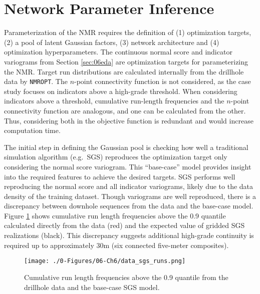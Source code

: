 \FloatBarrier
\section{Network Parameter Inference}
\label{sec:06param}

Parameterization of the \gls{NMR} requires the definition of (1) optimization targets, (2) a pool of latent Gaussian factors, (3) network architecture and (4) optimization hyperparameters. The continuous normal score and indicator variograms from Section \ref{sec:06eda} are optimization targets for parameterizing the \gls{NMR}. Target run distributions are calculated internally from the drillhole data by \texttt{NMROPT}. The $n$-point connectivity function is not considered, as the case study focuses on indicators above a high-grade threshold. When considering indicators above a threshold, cumulative run-length frequencies and the $n$-point connectivity function are analogous, and one can be calculated from the other. Thus, considering both in the objective function is redundant and would increase computation time.

The initial step in defining the Gaussian pool is checking how well a traditional simulation algorithm (e.g.\ \gls{SGS}) reproduces the optimization target only considering the normal score variogram. This ``base-case'' model provides insight into the required features to achieve the desired targets. \Gls{SGS} performs well reproducing the normal score and all indicator variograms, likely due to the data density of the training dataset. Though variograms are well reproduced, there is a discrepancy between downhole sequences from the data and the base-case model. Figure \ref{fig:data_sgs_runs} shows cumulative run length frequencies above the 0.9 quantile calculated directly from the data (red) and the expected value of gridded \gls{SGS} realizations (black). This discrepancy suggests additional high-grade continuity is required up to approximately 30m (six connected five-meter composites).

\begin{figure}[htb!]
    \centering
    \texttt{[image: ./0-Figures/06-Ch6/data\_sgs\_runs.png]}
    \caption{Cumulative run length frequencies above the 0.9 quantile from the drillhole data and the base-case \gls{SGS} model.}
    \label{fig:data_sgs_runs}
\end{figure}


